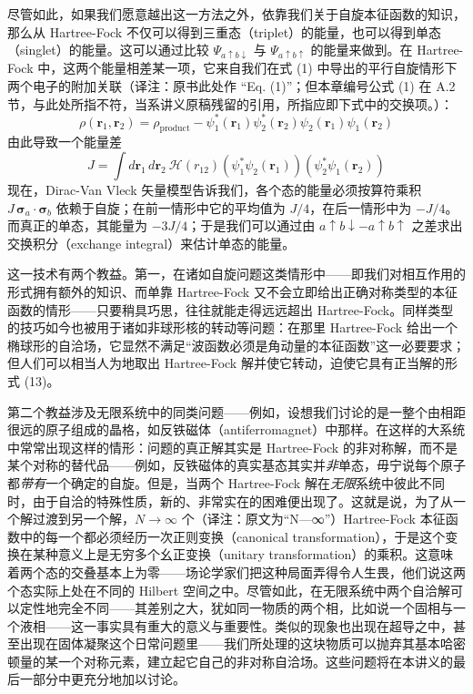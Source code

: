 尽管如此，如果我们愿意越出这一方法之外，依靠我们关于自旋本征函数的知识，那么从 Hartree-Fock 不仅可以得到三重态（triplet）的能量，也可以得到单态（singlet）的能量。这可以通过比较 $\Psi_{a\uparrow b\downarrow}$ 与 $\Psi_{a\uparrow b\uparrow}$ 的能量来做到。在 Hartree-Fock 中，这两个能量相差某一项，它来自我们在式 (1) 中导出的平行自旋情形下两个电子的附加关联（译注：原书此处作 “Eq. (1)”；但本章编号公式 (1) 在 A.2 节，与此处所指不符，当系讲义原稿残留的引用，所指应即下式中的交换项。）：
\begin{equation*}
\rho(\mathbf{r}_1,\mathbf{r}_2)=\rho_{\text{product}}-\psi_1^*(\mathbf{r}_1)\psi_2^*(\mathbf{r}_2)\psi_2(\mathbf{r}_1)\psi_1(\mathbf{r}_2)
\end{equation*}
由此导致一个能量差
\begin{equation*}
J=\int d\mathbf{r}_1\,d\mathbf{r}_2\ \mathcal{H}(r_{12})\left(\psi_1^*\psi_2(\mathbf{r}_1)\right)\left(\psi_2^*\psi_1(\mathbf{r}_2)\right)
\end{equation*}
现在，Dirac-Van Vleck 矢量模型告诉我们，各个态的能量必须按算符乘积 $J\,\boldsymbol{\sigma}_a\cdot\boldsymbol{\sigma}_b$ 依赖于自旋；在前一情形中它的平均值为 $J/4$，在后一情形中为 $-J/4$。而真正的单态，其能量为 $-3J/4$；于是我们可以通过由 $a\uparrow b\downarrow-a\uparrow b\uparrow$ 之差求出交换积分（exchange integral）来估计单态的能量。

这一技术有两个教益。第一，在诸如自旋问题这类情形中——即我们对相互作用的形式拥有额外的知识、而单靠 Hartree-Fock 又不会立即给出正确对称类型的本征函数的情形——只要稍具巧思，往往就能走得远远超出 Hartree-Fock。同样类型的技巧如今也被用于诸如非球形核的转动等问题：在那里 Hartree-Fock 给出一个椭球形的自洽场，它显然不满足“波函数必须是角动量的本征函数”这一必要要求；但人们可以相当人为地取出 Hartree-Fock 解并使它转动，迫使它具有正当解的形式 (13)。

第二个教益涉及无限系统中的同类问题——例如，设想我们讨论的是一整个由相距很远的原子组成的晶格，如反铁磁体（antiferromagnet）中那样。在这样的大系统中常常出现这样的情形：问题的真正解其实是 Hartree-Fock 的非对称解，而不是某个对称的替代品——例如，反铁磁体的真实基态其实并\emph{非}单态，毋宁说每个原子都\emph{带有}一个确定的自旋。但是，当两个 Hartree-Fock 解在\emph{无限}系统中彼此不同时，由于自洽的特殊性质，新的、非常实在的困难便出现了。这就是说，为了从一个解过渡到另一个解，$N\to\infty$ 个（译注：原文为“N—∞”）Hartree-Fock 本征函数中的每一个都必须经历一次正则变换（canonical transformation），于是这个变换在某种意义上是无穷多个幺正变换（unitary transformation）的乘积。这意味着两个态的交叠基本上为零——场论学家们把这种局面弄得令人生畏，他们说这两个态实际上处在不同的 Hilbert 空间之中。尽管如此，在无限系统中两个自洽解可以定性地完全不同——其差别之大，犹如同一物质的两个相，比如说一个固相与一个液相——这一事实具有重大的意义与重要性。类似的现象也出现在超导之中，甚至出现在固体凝聚这个日常问题里——我们所处理的这块物质可以抛弃其基本哈密顿量的某一个对称元素，建立起它自己的非对称自洽场。这些问题将在本讲义的最后一部分中更充分地加以讨论。

